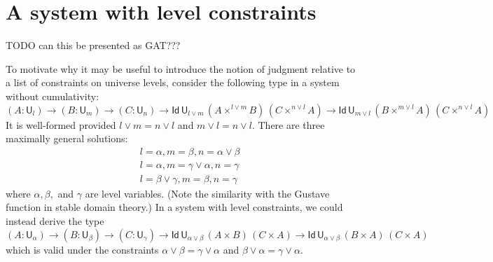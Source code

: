 \documentclass[11pt,a4paper]{article}
\newcommand{\Id}{\mathsf{Id}}
\def\UU{\mathsf{U}}
\begin{document}

\section{A system with level constraints}\label{sec:constraints}


TODO   can this be presented as GAT???

To motivate why it may be useful to introduce the notion of judgment relative to a list of constraints on universe levels, consider the following type in a system without cumulativity:
%
$$
    (A : \UU_l) \to (B : \UU_m) \to (C : \UU_n) 
    \to \Id\,\UU_{l \vee m}\, (A\times^{l \vee m} B)\,(C \times^{n \vee l} A)
    \to \Id\,\UU_{m \vee l} \, (B\times^{m \vee l} A)\,(C \times^{n \vee l} A)
$$
It is well-formed provided $l \vee m = n \vee l$ and $m \vee l = n \vee l$. There are three maximally general solutions: 
\begin{eqnarray*}
&&l = \alpha, m = \beta, n = \alpha \vee \beta\\
&&l = \alpha, m = \gamma \vee \alpha, n = \gamma\\
&&l = \beta \vee \gamma, m = \beta, n = \gamma
\end{eqnarray*}
where $\alpha, \beta,$ and $\gamma$ are level variables.
%
(Note the similarity with the Gustave function in stable domain theory.)
In a system with level constraints, we could instead derive the type
$$
    (A : \UU_\alpha) \to (B : \UU_\beta) \to (C : \UU_\gamma) 
    \to \Id\,\UU_{\alpha \vee \beta}\, (A\times B)\,(C \times A)
    \to \Id\,\UU_{\alpha \vee \beta}\, (B\times A)\,(C \times A)
$$
which is valid under the constraints
$
\alpha \vee \beta = \gamma \vee \alpha
$
and 
$
\beta \vee \alpha = \gamma \vee \alpha.
$
\end{document}
